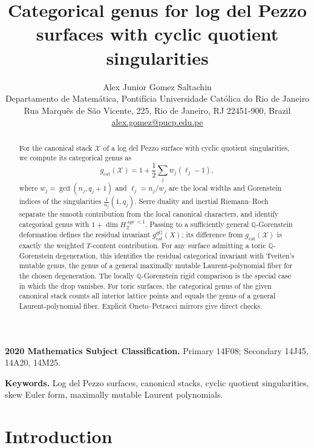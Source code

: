 \documentclass[11pt]{article}
\theoremstyle{plain}
\theoremstyle{definition}
\theoremstyle{remark}
\newcommand{\cX}{\mathcal X}
\newcommand{\Q}{\mathbb Q}
\newcommand{\1}{\mathbf 1}
\begin{document}
\title{Categorical genus for log del Pezzo surfaces with cyclic quotient singularities}
\author{Alex Junior Gomez Saltachin\\[0.5em]
\small Departamento de Matem\'atica, Pontif\'icia Universidade Cat\'olica do Rio de Janeiro\\
\small Rua Marqu\^es de S\~ao Vicente, 225, Rio de Janeiro, RJ 22451-900, Brazil\\
\small \href{mailto:alex.gomez@pucp.edu.pe}{alex.gomez@pucp.edu.pe}}
\date{}

\maketitle

\begin{abstract}
For the canonical stack $\cX$ of a log del Pezzo surface with cyclic quotient singularities, we compute its categorical genus as
\[
g_{\mathrm{cat}}(\cX)=1+\frac12\sum_j w_j(\ell_j-1),
\]
where $w_j=\gcd(n_j,q_j+1)$ and $\ell_j=n_j/w_j$ are the local widths and Gorenstein indices of the singularities $\frac1{n_j}(1,q_j)$.  Serre duality and inertial Riemann--Roch separate the smooth contribution from the local canonical characters, and identify categorical genus with $1+\dim H^{\operatorname{age}<1}_{\cX}$.  Passing to a sufficiently general $\Q$-Gorenstein deformation defines the residual invariant $g_{\mathrm{cat}}^{\mathrm{qG}}(X)$; its difference from $g_{\mathrm{cat}}(\cX)$ is exactly the weighted $T$-content contribution.  For any surface admitting a toric $\Q$-Gorenstein degeneration, this identifies the residual categorical invariant with Tveiten's mutable genus, the genus of a general maximally mutable Laurent-polynomial fiber for the chosen degeneration.  The locally $\Q$-Gorenstein rigid comparison is the special case in which the drop vanishes.  For toric surfaces, the categorical genus of the given canonical stack counts all interior lattice points and equals the genus of a general Laurent-polynomial fiber.  Explicit Oneto--Petracci mirrors give direct checks.
\end{abstract}

\medskip
\noindent\textbf{2020 Mathematics Subject Classification.}
Primary 14F08; Secondary 14J45, 14A20, 14M25.

\smallskip
\noindent\textbf{Keywords.}
Log del Pezzo surfaces, canonical stacks, cyclic quotient singularities, skew Euler form, maximally mutable Laurent polynomials.

\section{Introduction}
\end{document}
